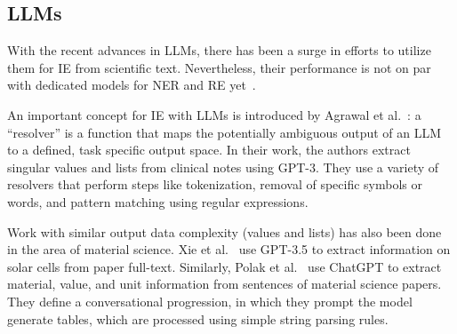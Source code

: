 \subsection{LLMs}

With the recent advances in LLMs, there has been a surge in efforts to utilize them for IE from scientific text. Nevertheless, their performance is not on par with dedicated models for NER and RE yet~\cite{Yang2023}.

An important concept for IE with LLMs is introduced by Agrawal et al.~\cite{Agrawal2022}: a ``resolver'' is a function that maps the potentially ambiguous output of an LLM to a defined, task specific output space. In their work, the authors extract singular values and lists from clinical notes using GPT-3. They use a variety of resolvers that perform steps like tokenization, removal of specific symbols or words, and pattern matching using regular expressions.

Work with similar output data complexity (values and lists) has also been done in the area of material science. Xie et al.~\cite{Xie2023} use GPT-3.5 to extract information on solar cells from paper full-text.
Similarly, Polak et al.~\cite{Polak2023} use ChatGPT %
to extract material, value, and unit information from sentences of material science papers. They define a conversational progression, in which they prompt the model generate tables, which are processed using simple string parsing rules.

